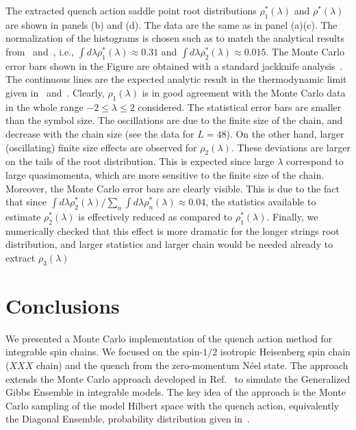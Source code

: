 \documentclass[11pt]{iopart}
\begin{document}
The extracted quench action saddle point root distributions $\rho^*_1(\lambda)$ and 
$\rho^*(\lambda)$ are shown in panels (b) and (d). The data are the same as in panel 
(a)(c). The normalization of the histograms is chosen such as to match the analytical 
results from~ and~, i.e., $\int d\lambda
\rho^*_1(\lambda)\approx0.31$ and $\int d\lambda\rho^*_2(\lambda)\approx
0.015$. The Monte Carlo error bars shown in the Figure are obtained with a standard 
jackknife analysis~\cite{quenouille-1949,wolff-2004}. 
The continuous lines are the expected analytic result in the thermodynamic limit given 
in~ and~. 
Clearly, $\rho_1(\lambda)$ is in good agreement with the Monte Carlo data in the 
whole range $-2\le\lambda\le2$ considered. The statistical error bars are smaller 
than the symbol size. The oscillations are due to the finite size of the chain, and 
decrease with the chain size (see the data for $L=48$). 
On the other hand, larger (oscillating) finite size effects are observed for $\rho_2(\lambda)$. 
These deviations are larger on the tails of the root distribution. This is expected since 
large $\lambda$ correspond to large quasimomenta, which are more sensitive to the finite 
size of the chain. Moreover, the Monte Carlo error bars are clearly visible. This is 
due to the fact that since $\int d\lambda\rho^*_2(\lambda)/\sum_n\int d\lambda
\rho_n^*(\lambda)\approx 0.04$, the statistics available to estimate $\rho_2^*(\lambda)$ 
is effectively reduced as compared to $\rho_1^*(\lambda)$. 
Finally, we numerically checked that this effect is more dramatic for the longer strings 
root distribution, and larger statistics and larger chain would be needed already  
to extract $\rho_3(\lambda)$

\section{Conclusions}
\label{conclusions}

We presented a Monte Carlo implementation of the quench action method for integrable 
spin chains. We focused on the spin-$1/2$ isotropic Heisenberg spin chain ($XXX$ chain) 
and the quench from the zero-momentum N\'eel state. 
The approach extends the Monte Carlo approach developed in Ref.~\cite{alba-2015} to 
simulate the Generalized Gibbs Ensemble in integrable models. The key idea of the 
approach is the Monte Carlo sampling of the model Hilbert space with the quench 
action, equivalently the Diagonal Ensemble, probability distribution given 
in~. 
\end{document}
